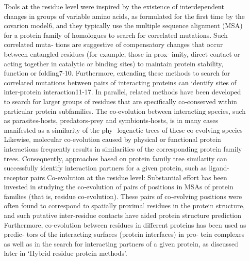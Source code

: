 Tools at the residue level were inspired by the existence of interdependent changes in groups of variable amino acids, as formulated for the first time by the covarion model6, and they typically use the multiple sequence alignment (MSA) for a protein family of homologues to search for correlated mutations.  \cite{de2013emerging}
Such correlated muta‐ tions are suggestive of compensatory changes that occur between entangled residues (for example, those in prox‐ imity, direct contact or acting together in catalytic or binding sites) to maintain protein stability, function or folding7-10. Furthermore, extending these methods to search for correlated mutations between pairs of interacting proteins can identify sites of inter‐protein interaction11-17. \cite{de2013emerging}
In parallel, related methods have been developed to search for larger groups of residues that are specifically co‐conserved within particular protein subfamilies.  \cite{de2013emerging}
The co‐evolution between interacting species, such as parasites-hosts, predators-prey and symbionts-hosts, is in many cases manifested as a similarity of the phy‐ logenetic trees of these co‐evolving species \cite{de2013emerging}
Likewise, molecular co‐evolution caused by physical or functional protein interactions frequently results in similarities of the corresponding protein family trees. Consequently, approaches based on protein family tree similarity can successfully identify interaction partners for a given protein, such as ligand-receptor pairs \cite{de2013emerging}
Co‐evolution at the residue level: Substantial effort has been invested in studying the co‐evolution of pairs of positions in MSAs of protein families (that is, residue co‐evolution). These pairs of co‐evolving positions were often found to correspond to spatially proximal residues in the protein structure, and such putative inter‐residue contacts have aided protein structure prediction  \cite{de2013emerging}
Furthermore, co‐evolution between residues in different proteins has been used as predic‐ tors of the interacting surfaces (protein interfaces) in pro‐ tein complexes as well as in the search for interacting partners of a given protein, as discussed later in `Hybrid residue-protein methods'. \cite{de2013emerging}

